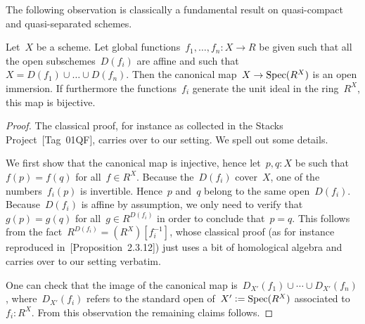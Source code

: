



The following observation is classically a fundamental result on quasi-compact
and quasi-separated schemes.

\begin{lemma}\label{enough-functions-affine}
  Let~$X$ be a scheme. Let global functions~$f_1,\ldots,f_n : X \to R$ be given
  such that all the open subschemes~$D(f_i)$ are affine and such that~$X =
  D(f_1) \cup \ldots \cup D(f_n)$. Then the canonical map~$X \to \operatorname{Spec}(R^X)$ is
  an open immersion. If furthermore the functions~$f_i$ generate the unit ideal
  in the ring~$R^X$, this map is bijective.
\end{lemma}

\begin{proof}
  The classical proof, for instance as collected in the Stacks
  Project~\cite{stacks}[Tag~01QF], carries over to our setting. We spell out
  some details.

  We first show that the canonical map is injective, hence let~$p,q : X$ be such
  that~$f(p) = f(q)$ for all~$f \in R^X$. Because the~$D(f_i)$ cover~$X$, one
  of the numbers~$f_i(p)$ is invertible. Hence~$p$ and~$q$ belong to the same
  open~$D(f_i)$. Because~$D(f_i)$ is affine by assumption, we only need to
  verify that~$g(p) = g(q)$ for all~$g \in R^{D(f_i)}$ in order to conclude
  that~$p = q$. This follows from the fact~$R^{D(f_i)} = (R^X)[f_i^{-1}]$,
  whose classical proof (as for instance reproduced
  in~\cite{liu}[Proposition~2.3.12]) just uses a bit of homological algebra and
  carries over to our setting verbatim.

  One can check that the image of the canonical map is~$D_{X'}(f_1) \cup \cdots
  \cup D_{X'}(f_n)$, where~$D_{X'}(f_i)$ refers to the standard open of~$X'
  \vcentcolon= \operatorname{Spec}(R^X)$ associated to~$f_i : R^X$. From this observation the
  remaining claims follows.
\end{proof}


